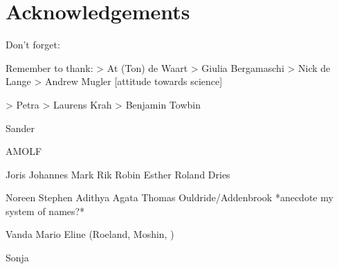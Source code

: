 



\chapter*{Acknowledgements}

Don't forget:



Remember to thank:
> At (Ton) de Waart
> Giulia Bergamaschi
> Nick de Lange
> Andrew Mugler [attitude towards science]

> Petra
> Laurens Krah
> Benjamin Towbin

Sander

AMOLF

Joris
Johannes
Mark
Rik
Robin
Esther
Roland Dries

Noreen
Stephen
Adithya
Agata
Thomas Ouldride/Addenbrook *anecdote my system of names?*

Vanda
Mario
Eline
(Roeland, Moshin, )

Sonja


